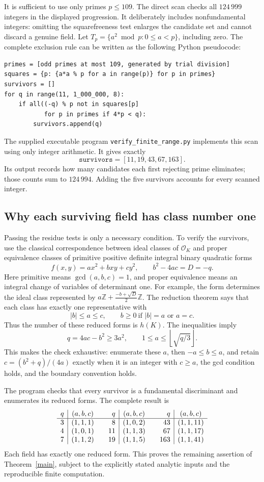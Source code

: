 \documentclass[11pt]{article}
\newcommand{\Z}{\mathbb Z}
\newcommand{\OK}{\mathcal O_K}
\begin{document}
It is sufficient to use only primes \(p\le109\). The direct scan checks
all \(124\,999\) integers in the displayed progression. It deliberately
includes nonfundamental integers: omitting the squarefreeness test
enlarges the candidate set and cannot discard a genuine field.
Let \(T_p=\{a^2\bmod p:0\le a<p\}\), including zero. The complete
exclusion rule can be written as the following Python pseudocode:
\begin{verbatim}
primes = [odd primes at most 109, generated by trial division]
squares = {p: {a*a % p for a in range(p)} for p in primes}
survivors = []
for q in range(11, 1_000_000, 8):
    if all((-q) % p not in squares[p]
           for p in primes if 4*p < q):
        survivors.append(q)
\end{verbatim}
The supplied executable program \texttt{verify\_finite\_range.py}
implements this scan using only integer arithmetic. It gives exactly
\[
 \texttt{survivors}=[11,19,43,67,163].
\]
Its output records how many candidates each first rejecting prime
eliminates; those counts sum to \(124\,994\). Adding the five survivors
accounts for every scanned integer.

\subsection{Why each surviving field has class number one}

Passing the residue tests is only a necessary condition. To verify the
survivors, use the classical correspondence between ideal classes of
\(\OK\) and proper equivalence classes of primitive positive definite
integral binary quadratic forms
\[
 f(x,y)=ax^2+bxy+cy^2,\qquad b^2-4ac=D=-q.
\]
Here primitive means \(\gcd(a,b,c)=1\), and proper equivalence means
an integral change of variables of determinant one. For example, the
form determines the ideal class represented by
\(a\Z+\frac{-b+\sqrt D}{2}\Z\).
The reduction theorem says that each class has exactly one representative
with
\[
 |b|\le a\le c,\qquad
 b\ge0\ \text{if }|b|=a\text{ or }a=c.
\]
Thus the number of these reduced forms is \(h(K)\).
The inequalities imply
\[
 q=4ac-b^2\ge3a^2,\qquad
 1\le a\le\left\lfloor\sqrt{q/3}\right\rfloor.
\]
This makes the check exhaustive: enumerate these \(a\), then
\(-a\le b\le a\), and retain
\(c=(b^2+q)/(4a)\) exactly when it is an integer with \(c\ge a\),
the gcd condition holds, and the boundary convention holds.

The program checks that every survivor is a fundamental discriminant
and enumerates its reduced forms. The complete result is
\[
\begin{array}{r|c@{\qquad}r|c@{\qquad}r|c}
 q&(a,b,c)&q&(a,b,c)&q&(a,b,c)\\ \hline
 3&(1,1,1)&8&(1,0,2)&43&(1,1,11)\\
 4&(1,0,1)&11&(1,1,3)&67&(1,1,17)\\
 7&(1,1,2)&19&(1,1,5)&163&(1,1,41)
\end{array}
\]
Each field has exactly one reduced form. This proves the remaining
assertion of Theorem~\ref{main}, subject to the explicitly stated
analytic inputs and the reproducible finite computation.
\end{document}
